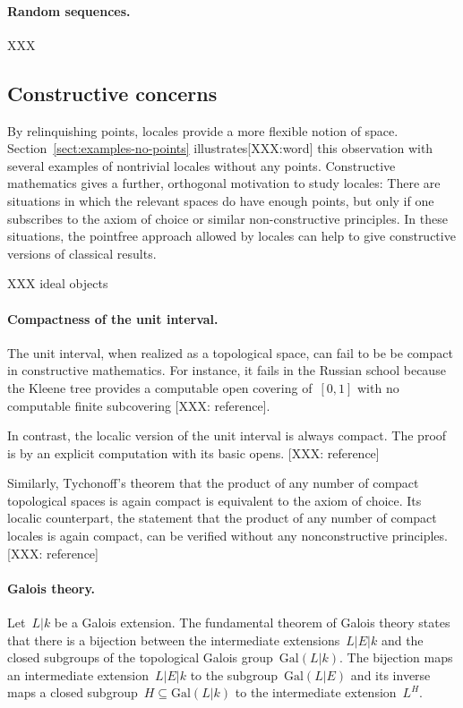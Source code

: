 \documentclass{ws-rv9x6}
\newcommand{\Gal}{\mathrm{Gal}}
\renewcommand{\_}{\mathpunct{.}}
\newcommand{\?}{\,{:}\,}
\begin{document}
\paragraph{Random sequences.} XXX


\subsection{Constructive concerns}

By relinquishing points, locales provide a more flexible notion of space.
Section~\ref{sect:examples-no-points} illustrates[XXX:word] this observation
with several examples of nontrivial locales without any points. Constructive
mathematics gives a further, orthogonal motivation to study locales: There are
situations in which the relevant spaces do have enough points, but only if one
subscribes to the axiom of choice or similar non-constructive principles. In
these situations, the pointfree approach allowed by locales can help to give
constructive versions of classical results.

XXX ideal objects

\paragraph{Compactness of the unit interval.} The unit interval, when realized
as a topological space, can fail to be be compact in constructive
mathematics. For instance, it fails in the Russian school because the Kleene
tree provides a computable open covering of~$[0,1]$ with no computable finite
subcovering [XXX: reference].

In contrast, the localic version of the unit interval is always compact. The
proof is by an explicit computation with its basic opens. [XXX: reference]

Similarly, Tychonoff's theorem that the product of any number of compact
topological spaces is again compact is equivalent to the axiom of choice. Its
localic counterpart, the statement that the product of any number of compact
locales is again compact, can be verified without any nonconstructive
principles. [XXX: reference]

\paragraph{Galois theory.} Let~$L|k$ be a Galois extension. The
fundamental theorem of Galois theory states that there is a bijection between
the intermediate extensions~$L|E|k$ and the closed subgroups of the topological
Galois group~$\Gal(L|k)$. The bijection maps an intermediate extension~$L|E|k$
to the subgroup~$\Gal(L|E)$ and its inverse maps a closed subgroup~$H \subseteq
\Gal(L|k)$ to the intermediate extension~$L^H$.
\end{document}
